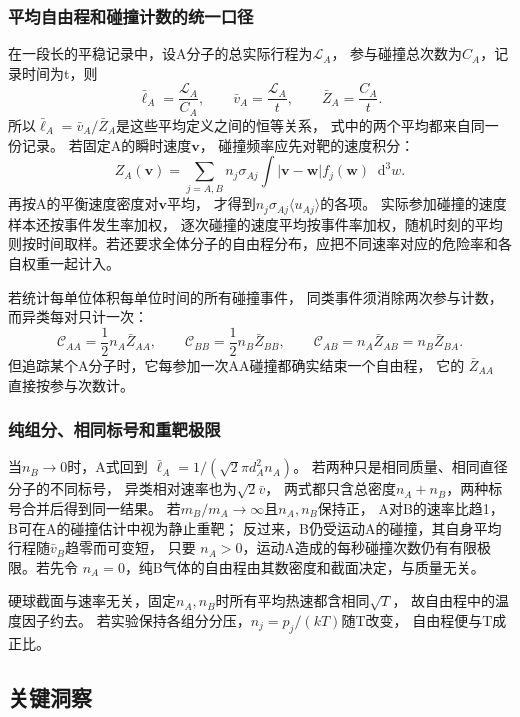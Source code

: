 \documentclass[UTF8,fontset=fandol,a4paper,11pt]{ctexart}
\newcommand{\dd}{\mathop{}\!\mathrm{d}}
\begin{document}
\subsubsection*{平均自由程和碰撞计数的统一口径}
在一段长的平稳记录中，设A分子的总实际行程为$\mathcal L_A$，
参与碰撞总次数为$C_A$，记录时间为t，则
\[
\bar\ell_A=\frac{\mathcal L_A}{C_A},\qquad
\bar v_A=\frac{\mathcal L_A}{t},\qquad
\bar Z_A=\frac{C_A}{t}.
\]
所以$\bar\ell_A=\bar v_A/\bar Z_A$是这些平均定义之间的恒等关系，
式中的两个平均都来自同一份记录。
若固定A的瞬时速度$\bm v$，
碰撞频率应先对靶的速度积分：
\[
Z_A(\bm v)=\sum_{j=A,B}n_j\sigma_{Aj}
\int|\bm v-\bm w|f_j(\bm w)\dd^3w.
\]
再按A的平衡速度密度对$\bm v$平均，
才得到$n_j\sigma_{Aj}\langle u_{Aj}\rangle$的各项。
实际参加碰撞的速度样本还按事件发生率加权，
逐次碰撞的速度平均按事件率加权，随机时刻的平均则按时间取样。若还要求全体分子的自由程分布，应把不同速率对应的危险率和各自权重一起计入。

若统计每单位体积每单位时间的所有碰撞事件，
同类事件须消除两次参与计数，而异类每对只计一次：
\[
\mathcal C_{AA}=\frac12n_A\bar Z_{AA},\qquad
\mathcal C_{BB}=\frac12n_B\bar Z_{BB},\qquad
\mathcal C_{AB}=n_A\bar Z_{AB}=n_B\bar Z_{BA}.
\]
但追踪某个A分子时，它每参加一次AA碰撞都确实结束一个自由程，
它的 $\bar Z_{AA}$ 直接按参与次数计。

\subsubsection*{纯组分、相同标号和重靶极限}
当$n_B\to0$时，A式回到
$\bar\ell_A=1/(\sqrt2\pi d_A^2n_A)$。
若两种只是相同质量、相同直径分子的不同标号，
异类相对速率也为$\sqrt2\bar v$，
两式都只含总密度$n_A+n_B$，两种标号合并后得到同一结果。
若$m_B/m_A\to\infty$且$n_A,n_B$保持正，
A对B的速率比趋1，B可在A的碰撞估计中视为静止重靶；
反过来，B仍受运动A的碰撞，其自身平均行程随$\bar v_B$趋零而可变短，
只要 $n_A>0$，运动A造成的每秒碰撞次数仍有有限极限。若先令 $n_A=0$，纯B气体的自由程由其数密度和截面决定，与质量无关。

硬球截面与速率无关，固定$n_A,n_B$时所有平均热速都含相同$\sqrt T$，
故自由程中的温度因子约去。
若实验保持各组分分压，$n_j=p_j/(kT)$随T改变，
自由程便与T成正比。




\subsection*{关键洞察}
\end{document}
